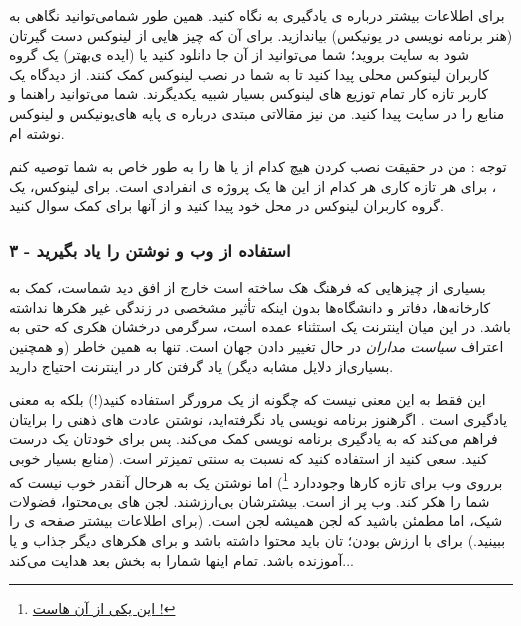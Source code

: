 برای اطلاعات بیشتر درباره ی یادگیری‌
 به
نگاه کنید. همین طور شمامی‌توانید نگاهی به
(هنر برنامه نویسی در یونیکس) بیاندازید.
برای آن که چیز هایی از لینوکس دست گیرتان شود به سایت
بروید؛ شما می‌توانید از آن جا دانلود کنید یا (ایده ی‌بهتر) یک گروه کاربران لینوکس محلی پیدا کنید تا به شما در نصب لینوکس کمک کنند. از دیدگاه یک کاربر تازه کار تمام توزیع های لینوکس بسیار شبیه یکدیگرند.
شما می‌توانید راهنما و منابع
 را در سایت
پیدا کنید.
من نیز مقالاتی مبتدی درباره ی پایه های‌یونیکس و لینوکس
نوشته ام.
\begin{mdframed}
توجه : من در حقیقت نصب کردن هیچ کدام از 
 یا 
ها را به طور خاص به شما توصیه کنم ، برای هر تازه کاری هر کدام از این ها یک پروژه ی انفرادی است. برای لینوکس، یک گروه کاربران لینوکس در محل خود پیدا کنید و از آنها برای کمک سوال کنید.
\end{mdframed}
\subsubsection*{۳ - استفاده از وب و نوشتن 
 را یاد بگیرید}
بسیاری از چیزهایی که فرهنگ هک ساخته است خارج از افق دید شماست، کمک به کارخانه‌ها، دفاتر و دانشگاه‌ها بدون اینکه تأثیر مشخصی در زندگی غیر هکرها نداشته باشد. در این میان اینترنت یک استثناء عمده است، سرگرمی درخشان هکری که حتی به اعتراف
\emph{سیاست مداران}
در حال تغییر دادن جهان است. تنها به همین خاطر (و همچنین بسیاری‌از دلایل مشابه دیگر) یاد گرفتن کار در اینترنت احتیاج دارید.

این فقط به این معنی نیست که چگونه از یک مرورگر استفاده کنید(!) بلکه به معنی یادگیری‌
 است . اگرهنوز برنامه نویسی یاد نگرفته‌اید، نوشتن 
 عادت های ذهنی‌ را برایتان فراهم می‌کند که به یادگیری برنامه نویسی کمک می‌کند. پس برای خودتان یک 
 درست کنید. سعی کنید از 
 استفاده کنید که نسبت به 
 سنتی تمیزتر است.
 (منابع بسیار خوبی برروی وب برای تازه کارها وجوددارد
\footnote{\href{http://www.make-a-web-site.com/}{این یکی از آن هاست !}}) اما نوشتن یک 
 به هرحال آنقدر خوب نیست که شما را هکر کند. وب پر از 
 است. بیشترشان بی‌ارزشند. لجن های بی‌محتوا، فضولات شیک، اما مطمئن باشید که لجن همیشه لجن است. (برای اطلاعات بیشتر صفحه ی
را ببینید.)
برای با ارزش بودن؛ 
 تان باید محتوا داشته باشد و برای هکرهای دیگر جذاب و یا آموزنده باشد. تمام اینها شمارا به بخش بعد هدایت می‌کند...
